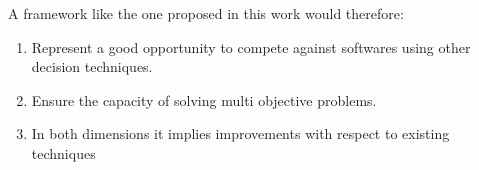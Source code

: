 A framework like the one proposed in this work would therefore:
\begin{enumerate}
	\item Represent a good opportunity to compete against softwares using other decision techniques.
	\item Ensure the capacity of solving multi objective problems.
	\item In both dimensions it implies improvements with respect to existing techniques
\end{enumerate}


